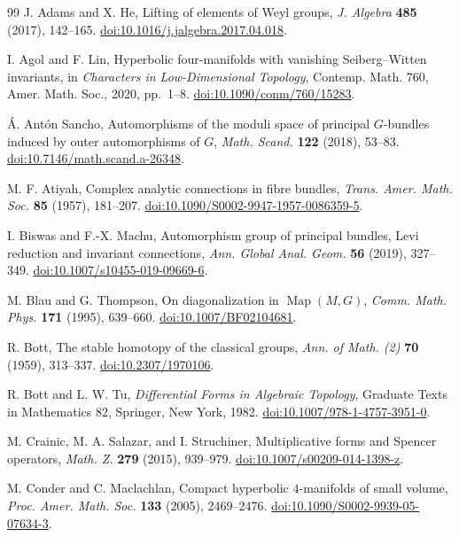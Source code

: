 \documentclass[11pt]{amsart}
\theoremstyle{plain}
\theoremstyle{definition}
\theoremstyle{remark}
\begin{document}
\begin{thebibliography}{99}
\small
{}
J. Adams and X. He, Lifting of elements of Weyl groups,
\emph{J. Algebra} \textbf{485} (2017), 142--165.
\href{https://doi.org/10.1016/j.jalgebra.2017.04.018}{doi:10.1016/j.jalgebra.2017.04.018}.

I. Agol and F. Lin, Hyperbolic four-manifolds with vanishing
Seiberg--Witten invariants, in \emph{Characters in Low-Dimensional
Topology}, Contemp. Math. 760, Amer. Math. Soc., 2020, pp.~1--8.
\href{https://doi.org/10.1090/conm/760/15283}{doi:10.1090/conm/760/15283}.

\'A. Ant\'on Sancho, Automorphisms of the moduli space of principal $G$-bundles induced by outer automorphisms of $G$,
\emph{Math. Scand.} \textbf{122} (2018), 53--83.
\href{https://doi.org/10.7146/math.scand.a-26348}{doi:10.7146/math.scand.a-26348}.

M. F. Atiyah, Complex analytic connections in fibre bundles,
\emph{Trans. Amer. Math. Soc.} \textbf{85} (1957), 181--207.
\href{https://doi.org/10.1090/S0002-9947-1957-0086359-5}{doi:10.1090/S0002-9947-1957-0086359-5}.

I. Biswas and F.-X. Machu, Automorphism group of principal bundles,
Levi reduction and invariant connections,
\emph{Ann. Global Anal. Geom.} \textbf{56} (2019), 327--349.
\href{https://doi.org/10.1007/s10455-019-09669-6}{doi:10.1007/s10455-019-09669-6}.

M. Blau and G. Thompson, On diagonalization in $\operatorname{Map}(M,G)$,
\emph{Comm. Math. Phys.} \textbf{171} (1995), 639--660.
\href{https://doi.org/10.1007/BF02104681}{doi:10.1007/BF02104681}.

R. Bott, The stable homotopy of the classical groups,
\emph{Ann. of Math. (2)} \textbf{70} (1959), 313--337.
\href{https://doi.org/10.2307/1970106}{doi:10.2307/1970106}.

R. Bott and L. W. Tu, \emph{Differential Forms in Algebraic Topology},
Graduate Texts in Mathematics 82, Springer, New York, 1982.
\href{https://doi.org/10.1007/978-1-4757-3951-0}{doi:10.1007/978-1-4757-3951-0}.

M. Crainic, M. A. Salazar, and I. Struchiner, Multiplicative forms and Spencer operators,
\emph{Math. Z.} \textbf{279} (2015), 939--979.
\href{https://doi.org/10.1007/s00209-014-1398-z}{doi:10.1007/s00209-014-1398-z}.

M. Conder and C. Maclachlan, Compact hyperbolic $4$-manifolds of small
volume, \emph{Proc. Amer. Math. Soc.} \textbf{133} (2005), 2469--2476.
\href{https://doi.org/10.1090/S0002-9939-05-07634-3}{doi:10.1090/S0002-9939-05-07634-3}.


\end{thebibliography}
\end{document}
